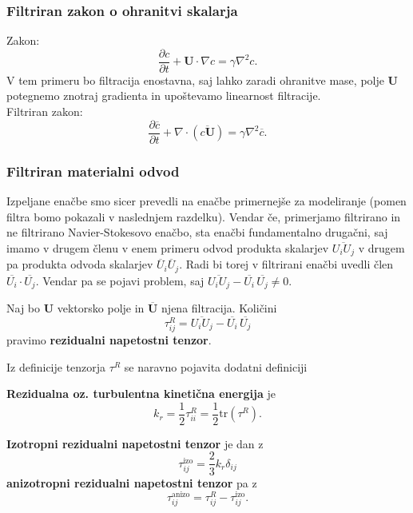 \documentclass[mat2, tisk]{fmfdelo}
\newcommand{\bd}{\textbf}
\begin{document}
\subsubsection{Filtriran zakon o ohranitvi skalarja}

Zakon:
$$
\frac{\partial c}{\partial t} + \bd{U}\cdot\nabla c = \gamma \nabla^2 c.
$$
V tem primeru bo filtracija enostavna, saj lahko zaradi ohranitve mase, polje $\bd{U}$ 
potegnemo znotraj gradienta in upoštevamo linearnost filtracije. \\
Filtriran zakon:
\begin{equation}
\frac{\partial \overline{c}}{\partial t} + \nabla \cdot (\overline{c\bd{U}}) = \gamma \nabla^2 \overline{c}.
\end{equation}

\subsubsection{Filtriran materialni odvod}

Izpeljane enačbe smo sicer prevedli na enačbe primernejše za modeliranje (pomen filtra bomo 
pokazali v naslednjem razdelku). Vendar če, primerjamo filtrirano in 
ne filtrirano Navier-Stokesovo enačbo, sta enačbi fundamentalno drugačni, saj imamo 
v drugem členu v enem primeru odvod produkta skalarjev $\overline{U_i U_j}$ v drugem pa produkta odvoda
skalarjev $\overline{U}_i \overline{U}_j$. Radi bi torej v filtrirani enačbi uvedli člen $\overline{U_i} \cdot \overline{U_j}$.
Vendar pa se pojavi problem, saj $\overline{U_i U_j}-\overline{U_i}\,\overline{U_j} \neq 0$. 
\begin{definicija}
Naj bo $\bd{U}$ vektorsko polje in $\overline{\bd{U}}$ njena filtracija. Količini 
\begin{equation}
\tau_{ij}^R = \overline{U_i U_j} - \overline{U_i} \,\overline{U_j}
\end{equation}
pravimo \textbf{rezidualni napetostni tenzor}.
\end{definicija}

Iz definicije tenzorja $\tau^R$ se naravno pojavita dodatni definiciji
\begin{definicija}
\bd{Rezidualna oz. turbulentna kinetična energija} je 
\begin{equation}
k_r = \frac{1}{2} \tau_{ii}^R = \frac{1}{2}\text{tr}(\tau^R).
\end{equation}
\end{definicija}

\begin{definicija}
\textbf{Izotropni rezidualni napetostni tenzor} je dan z 
\begin{equation}
\tau_{ij}^\text{izo} = \frac{2}{3} k_r \delta_{ij}
\end{equation}
\textbf{anizotropni rezidualni napetostni tenzor} pa z 
\begin{equation}
\tau_{ij}^\text{anizo} = \tau_{ij}^R - \tau_{ij}^\text{izo}.
\end{equation}
\end{definicija}
\end{document}
